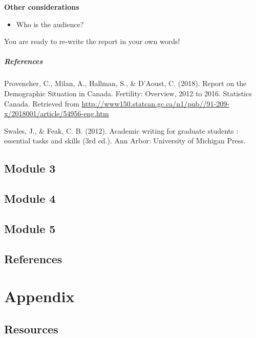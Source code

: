 \documentclass[
  openany]{book}
\providecommand{\tightlist}{%
  \setlength{\itemsep}{0pt}\setlength{\parskip}{0pt}}
\begin{document}
\textbf{Other considerations}

\begin{itemize}
\tightlist
\item
  Who is the audience?
\end{itemize}

You are ready to re-write the report in your own words!

\hypertarget{pararef}{%
\subsubsection{References}\label{pararef}}

Provencher, C., Milan, A., Hallman, S., \& D'Aoust, C. (2018). Report on the Demographic Situation in Canada. Fertility: Overview, 2012 to 2016. Statistics Canada. Retrieved from \url{http://www150.statcan.gc.ca/n1/pub//91-209-x/2018001/article/54956-eng.htm}

Swales, J., \& Feak, C. B. (2012). Academic writing for graduate students : essential tasks and skills (3rd ed.). Ann Arbor: University of Michigan Press.

\hypertarget{module-3}{%
\chapter{Module 3}\label{module-3}}

\hypertarget{module-4}{%
\chapter{Module 4}\label{module-4}}

\hypertarget{module-5}{%
\chapter{Module 5}\label{module-5}}

\hypertarget{references}{%
\chapter*{References}\label{references}}

\hypertarget{part-appendix}{%
\part*{Appendix}\label{part-appendix}}

\hypertarget{resources}{%
\chapter{Resources}\label{resources}}
\end{document}

